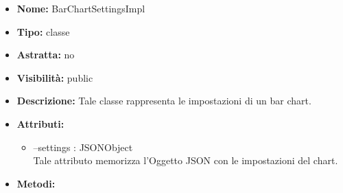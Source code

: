 			
			\begin{itemize}
			\item \textbf{Nome:} BarChartSettingsImpl
			\item \textbf{Tipo:} classe
			
		\item \textbf{Astratta:}
		no
			\item \textbf{Visibilità:} public
			\item \textbf{Descrizione:} Tale classe rappresenta le impostazioni di un bar chart.
			\item \textbf{Attributi:}
				\begin{itemize}
				\setlength{\itemsep}{5pt}
				
					\item[\ding{111}] {--settings : JSONObject} \\ [1mm] Tale attributo memorizza l'Oggetto JSON con le impostazioni del chart.
				\end{itemize}
		
			\item \textbf{Metodi:}
				\begin{itemize}
				\setlength{\itemsep}{5pt}
				

\end{itemize}
\end{itemize}
